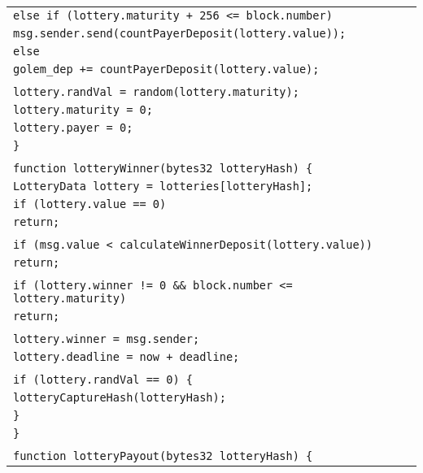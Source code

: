 \documentclass[a4paper]{article}
\begin{document}
\begin{tabularx}{\linewidth}{l}
        \qquad\qquad\texttt{else if~(lottery.maturity + 256 <= block.number)}\\
        \qquad\qquad\qquad\texttt{msg.sender.send(countPayerDeposit(lottery.value));}\\
        \qquad\qquad\texttt{else}\\
        \qquad\qquad\qquad\texttt{golem\_dep += countPayerDeposit(lottery.value);}\\
        \\
        \qquad\qquad\texttt{lottery.randVal = random(lottery.maturity);}\\
        \qquad\qquad\texttt{lottery.maturity = 0;}\\
        \qquad\qquad\texttt{lottery.payer = 0;}\\
        \qquad\texttt{\}}\\
        \\
        \qquad\texttt{function lotteryWinner(bytes32 lotteryHash) \{}\\
        \qquad\qquad\texttt{LotteryData lottery = lotteries[lotteryHash];}\\
        \qquad\qquad\texttt{if (lottery.value == 0)}\\
        \qquad\qquad\qquad\texttt{return;}\\
        \\
        \qquad\qquad\texttt{if (msg.value < calculateWinnerDeposit(lottery.value))}\\
        \qquad\qquad\qquad\texttt{return;}\\
        \\
        \qquad\qquad\texttt{if (lottery.winner != 0 \&\& block.number <= lottery.maturity)}\\
        \qquad\qquad\qquad\texttt{return;}\\
        \\
        \qquad\qquad\texttt{lottery.winner = msg.sender;}\\
        \qquad\qquad\texttt{lottery.deadline = now + deadline;}\\
        \\
        \qquad\qquad\texttt{if (lottery.randVal == 0) \{}\\
        \qquad\qquad\qquad\texttt{lotteryCaptureHash(lotteryHash);}\\
        \qquad\qquad\texttt{\}}\\
        \qquad\texttt{\}}\\
        \\
        \qquad\texttt{function lotteryPayout(bytes32 lotteryHash) \{}\\

\end{tabularx}
\end{document}
